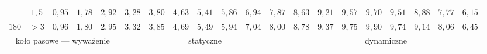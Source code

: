 \begin{table}[]
{\begin{tabular}{|c|c|c|c|c|c|c|c|c|c|c|c|c|c|c|c|c|c|c|c|}
                        & $1,5$                                                                               & \cellcolor[HTML]{FFCCC9}$0,95$ & \cellcolor[HTML]{FFCCC9}$1,78$ & \cellcolor[HTML]{FD6864}$2,92$ & \cellcolor[HTML]{FD6864}$3,28$ & \cellcolor[HTML]{FD6864}$3,80$ & \cellcolor[HTML]{FE0000}$4,63$ & \cellcolor[HTML]{FE0000}$5,41$ & \cellcolor[HTML]{CB0000}$5,86$ & \cellcolor[HTML]{CB0000}$6,94$ & \cellcolor[HTML]{9A0000}$7,87$ & \cellcolor[HTML]{F8A102}$8,63$ & \cellcolor[HTML]{F56B00}$9,21$ & \cellcolor[HTML]{F56B00}$9,57$                        & \cellcolor[HTML]{CE6301}$9,70$ & \cellcolor[HTML]{963400}$9,51$ & \cellcolor[HTML]{963400}$8,88$ & \cellcolor[HTML]{963400}$7,77$ & \cellcolor[HTML]{963400}$6,15$ \\ \cline{2-20} 
\multirow{-5}{*}{$180$} & $>3$                                                                                & \cellcolor[HTML]{FFCCC9}$0,96$ & \cellcolor[HTML]{FFCCC9}$1,80$ & \cellcolor[HTML]{FD6864}$2,95$ & \cellcolor[HTML]{FD6864}$3,32$ & \cellcolor[HTML]{FD6864}$3,85$ & \cellcolor[HTML]{FE0000}$4,69$ & \cellcolor[HTML]{FE0000}$5,49$ & \cellcolor[HTML]{CB0000}$5,94$ & \cellcolor[HTML]{CB0000}$7,04$ & \cellcolor[HTML]{9A0000}$8,00$ & \cellcolor[HTML]{F8A102}$8,78$ & \cellcolor[HTML]{F56B00}$9,37$ & \cellcolor[HTML]{F56B00}$9,75$                        & \cellcolor[HTML]{CE6301}$9,90$ & \cellcolor[HTML]{963400}$9,74$ & \cellcolor[HTML]{963400}$9,14$ & \cellcolor[HTML]{963400}$8,06$ & \cellcolor[HTML]{963400}$6,45$ \\ \hline
\multicolumn{5}{|c|}{koło pasowe --- wyważenie}                                                                                                                                                                  & \multicolumn{7}{c|}{statyczne}                                                                                                                                                                                                       & \multicolumn{8}{c|}{dynamiczne}                                                                                                                                                                                                                                                              \\ \hline
\end{tabular}
}
\end{table}